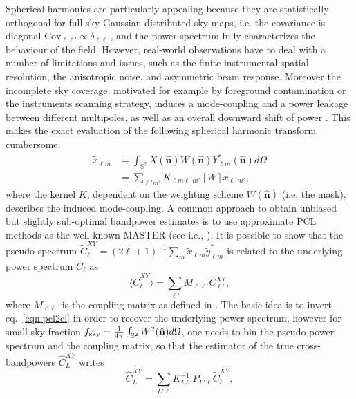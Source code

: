 \documentclass[a4paper,11pt]{article}
\newcommand{\nver}{\hat{\mathbf{n}}}
\begin{document}
Spherical harmonics are particularly appealing because they are statistically orthogonal for full-sky 
Gaussian-distributed sky-maps, i.e. the covariance is diagonal $\text{Cov}_{\ell \ell'}\propto \delta_{\ell
\ell'}$, and the power spectrum fully characterizes the behaviour of the field. However, real-world observations have to deal with
a number of limitations and issues, such as the finite instrumental spatial resolution, the anisotropic 
noise, and asymmetric beam response. Moreover the incomplete sky coverage, motivated for example 
by foreground contamination or the instruments scanning strategy, induces a mode-coupling and a power leakage between 
different multipoles, as well as an overall downward shift of power \citep{Hivon2001,Efstathiou2004}. This makes the exact 
evaluation of the following spherical harmonic transform cumbersome:
%
\begin{equation}
\begin{split}
\tilde{x}_{\ell m} &= \int_{\mathbb{S}^2}X(\nver)W(\nver)Y^*_{\ell m}(\nver)d\Omega \\
&= \sum_{\ell' m'} K_{\ell m \ell' m' }[W] x_{\ell' m'},
\end{split}
\label{eqn:sphcoeffmask}
\end{equation}
%
where the kernel $K$, dependent on the weighting scheme $W(\nver)$ (i.e. the mask), describes the induced mode-coupling. 
A common approach to obtain unbiased but slightly sub-optimal bandpower estimates is to use approximate PCL 
methods as the well known MASTER (see i.e., \citep{Hivon2001,Efstathiou2004}). It is possible to show that the pseudo-spectrum 
$\tilde{C}^{XY}_{\ell} = (2\ell+1)^{-1}\sum_m \tilde{x}_{\ell m}\tilde{y}^*_{\ell m}$ is related to the underlying power spectrum $C_{\ell}$ as 
%
\begin{equation}
\label{eqn:pcl2cl}
\langle \tilde{C}^{XY}_{\ell}\rangle = \sum_{\ell'} M_{\ell\ell'} C^{XY}_{\ell'},
\end{equation}
%
where $M_{\ell\ell'}$ is the coupling matrix as defined in \cite{Hivon2001}. The basic idea is to invert eq.~\ref{eqn:pcl2cl} in order to 
recover the underlying power spectrum, however for small sky fraction  $f_{\rm sky}=\frac{1}{4\pi}\int_{\mathbb{S}^2}W^2(\nver)d\Omega$, 
one needs to bin the pseudo-power spectrum and the coupling matrix, so that the estimator of the true
 cross-bandpowers $\hat{C}^{XY}_{L}$ writes
%
\begin{equation}
\label{eqn:master_xy}
\hat{C}^{XY}_{L} = \sum_{L' \ell}K^{-1}_{LL'}P_{L'\ell}\tilde{C}^{XY}_{\ell},
\end{equation}
\end{document}
